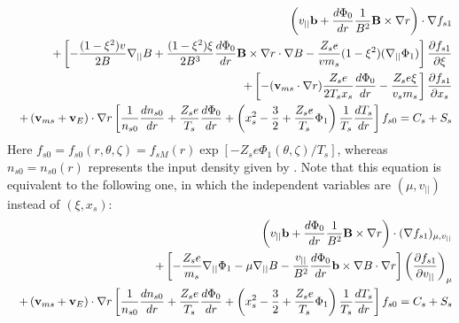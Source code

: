 \begin{eqnarray}
&&\left(v_{||}{\mathbf b} + \frac{d\Phi_0}{dr} \frac{1}{B^2} {\mathbf B}\times\nabla r \right) \cdot \nabla f_{s1} \\
&&+ \left[ - \frac{(1-\xi^2)v}{2B} \nabla_{||} B
+\frac{(1-\xi^2)\xi}{2B^3} \frac{d\Phi_0}{dr}{\mathbf B}\times\nabla r\cdot\nabla B 
-\frac{Z_s e}{v m_s}(1-\xi^2)(\nabla_{||}\Phi_1)
\right]
 \frac{\partial f_{s1}}{\partial \xi} \nonumber \\
&&+ \left[
-({\mathbf v}_{ms} \cdot\nabla r) \frac{Z_s e}{2 T_s x_s} \frac{d\Phi_0}{dr} 
-\frac{Z_s e \xi}{v_s m_s}
\right] \frac{\partial f_{s1}}{\partial x_s} \nonumber \\
&&+ \left({\mathbf v}_{ms} + {\mathbf v}_E\right) \cdot \nabla r \left[ \frac{1}{n_{s 0}} \frac{dn_{s 0}}{dr} + \frac{Z_s e}{T_s} \frac{d\Phi_0}{dr} + \left(x_s^2 - \frac{3}{2} + \frac{Z_s e}{T_s}\Phi_1\right) \frac{1}{T_s} \frac{dT_s}{dr}\right] f_{s0}
 = C_s + S_s \nonumber
\end{eqnarray}
Here $\displaystyle f_{s0} = f_{s0}\left(r,\theta,\zeta\right) = f_{sM}\left(r\right) \exp \left[- Z_s e \Phi_1(\theta,\zeta) / T_s \right]$, 
whereas $n_{s 0} = n_{s 0} \left(r\right)$ represents the input density given by . 
Note that this equation is equivalent to the following one, in which the independent variables
are $(\mu,v_{||})$ instead of $(\xi,x_s)$:
\begin{eqnarray}
&&\left(v_{||}{\mathbf b} + \frac{d\Phi_0}{dr} \frac{1}{B^2} {\mathbf B}\times\nabla r \right) \cdot (\nabla f_{s1})_{\mu, v_{||}} \\
&&+ \left[ -\frac{Z_s e}{m_s} \nabla_{||} \Phi_1
- \mu \nabla_{||} B
-\frac{v_{||}}{B^2} \frac{d\Phi_0}{dr} {\mathbf b}\times\nabla B \cdot \nabla r \right]
\left( \frac{\partial f_{s1}}{\partial v_{||}} \right)_{\mu} \nonumber \\
&& + \left({\mathbf v}_{ms} + {\mathbf v}_E\right) \cdot \nabla r  \left[ \frac{1}{n_{s 0}} \frac{dn_{s 0}}{dr} + \frac{Z_s e}{T_s} \frac{d\Phi_0}{dr} + \left(x_s^2-\frac{3}{2} + \frac{Z_s e}{T_s}\Phi_1\right) \frac{1}{T_s} \frac{dT_s}{dr}\right] f_{s0}
=C_s + S_s \nonumber
\end{eqnarray}
